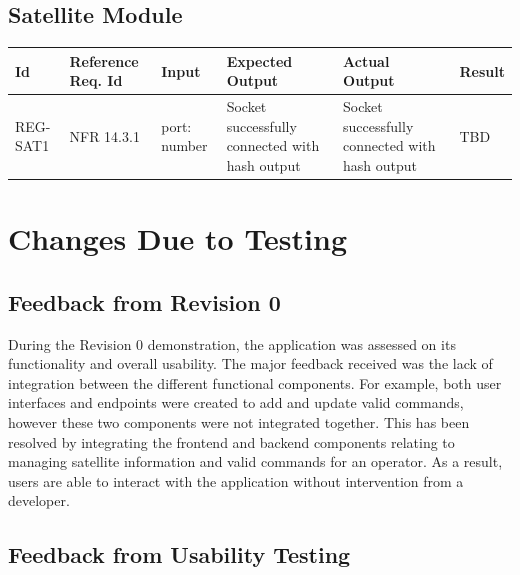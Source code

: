 \documentclass[12pt, titlepage]{article}
\begin{document}
\subsection{Satellite Module}
\begin{center}
\begin{tabular}{|p{1cm} | p{2cm} |p{2cm}| p{2cm} |p{2cm}| p{2cm}|}
\hline
\textbf{Id} & \textbf{Reference Req. Id} & \textbf{Input} & \textbf{Expected Output} & \textbf{Actual Output} & \textbf{Result} \\
\hline
REG-SAT1 & NFR 14.3.1 & { port: number }
 & Socket successfully connected with hash output
 & Socket successfully connected with hash output & TBD
\\
\hline

\end{tabular}

\end{center}



\section{Changes Due to Testing}

\subsection{Feedback from Revision 0}

During the Revision 0 demonstration, the application was assessed on its functionality and overall usability. The major feedback received was the lack of integration between the different functional components. For example, both user interfaces and endpoints were created to add and update valid commands, however these two components were not integrated together. This has been resolved by integrating the frontend and backend components relating to managing satellite information and valid commands for an operator. As a result, users are able to interact with the application without intervention from a developer.

\subsection{Feedback from Usability Testing}
\end{document}
